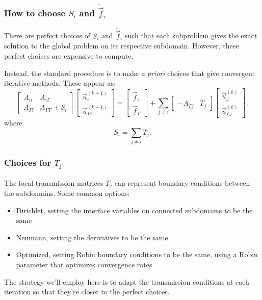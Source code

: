 \documentclass[10pt]{beamer}
\begin{document}
\begin{frame}
\frametitle{How to choose $S_i$ and $\tilde{\vec{f}}_i$}

There are perfect choices of $S_i$ and $\tilde{\vec{f}}_i$ such that each subproblem gives the exact solution to the global problem on its respective subdomain.
However, these perfect choices are expensive to compute.

Instead, the standard procedure is to make \textit{a priori} choices that give convergent iterative methods.
These appear as:
\begin{equation} \label{eq: iterative sub}
	\begin{bmatrix}
		A_{ii} & A_{i \Gamma} \\
		A_{\Gamma i} & A_{\Gamma \Gamma} + S_i
	\end{bmatrix}
	\begin{bmatrix} \vec{u}_i^{(k+1)} \\ \vec{u}_{\Gamma i}^{(k+1)} \end{bmatrix}
	=
	\begin{bmatrix} \vec{f}_i \\ \vec{f}_\Gamma \end{bmatrix}
	+ \sum_{j \neq i}
	\begin{bmatrix} ~ \\ -A_{\Gamma j} & T_j \end{bmatrix}
	\begin{bmatrix} \vec{u}_j^{(k)} \\ \vec{u}_{\Gamma j}^{(k)} \end{bmatrix},
\end{equation}
where
\begin{equation} \label{eq: local to global transmission}
	S_i = \sum_{j \neq i} T_j.
\end{equation}
\end{frame}

\begin{frame}
\frametitle{Choices for $T_j$}

The local transmission matrices $T_j$ can represent boundary conditions between the subdomains.
Some common options:
\begin{itemize}
\item Dirichlet, setting the interface variables on connected subdomains to be the same
\item Neumann, setting the derivatives to be the same
\item Optimized, setting Robin boundary conditions to be the same, using a Robin parameter that optimizes convergence rates
\end{itemize}

The strategy we'll employ here is to adapt the transmission conditions at each iteration so that they're closer to the perfect choices.

\end{frame}
\end{document}

